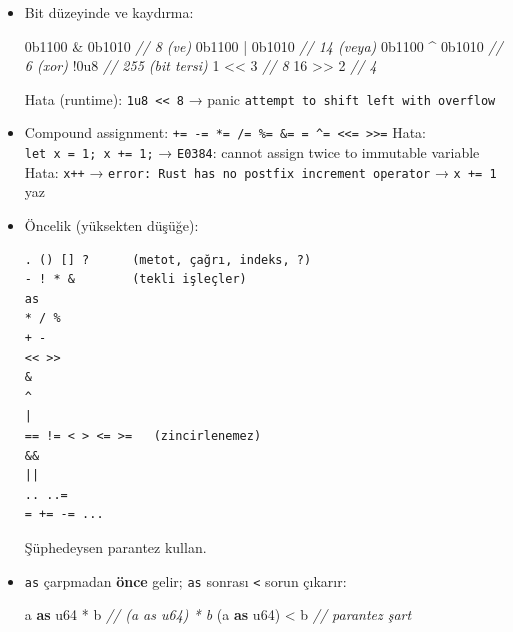 \documentclass[12pt,a4paper]{article}
\newenvironment{Shaded}{}{}
\newcommand{\BaseNTok}[1]{\textcolor[rgb]{0.25,0.63,0.44}{#1}}
\newcommand{\CommentTok}[1]{\textcolor[rgb]{0.38,0.63,0.69}{\textit{#1}}}
\newcommand{\DataTypeTok}[1]{\textcolor[rgb]{0.56,0.13,0.00}{#1}}
\newcommand{\DecValTok}[1]{\textcolor[rgb]{0.25,0.63,0.44}{#1}}
\newcommand{\KeywordTok}[1]{\textcolor[rgb]{0.00,0.44,0.13}{\textbf{#1}}}
\newcommand{\NormalTok}[1]{#1}
\newcommand{\OperatorTok}[1]{\textcolor[rgb]{0.40,0.40,0.40}{#1}}
\begin{document}
\begin{itemize}
  İlgili: \texttt{\&} ve \texttt{\textbar{}} bool üzerinde short-circuit yapmaz
\item
  Bit düzeyinde ve kaydırma:

\begin{Shaded}
\begin{Highlighting}[]
\BaseNTok{0b1100} \OperatorTok{\&} \BaseNTok{0b1010}   \CommentTok{// 8  (ve)}
\BaseNTok{0b1100} \OperatorTok{|} \BaseNTok{0b1010}   \CommentTok{// 14 (veya)}
\BaseNTok{0b1100} \OperatorTok{\^{}} \BaseNTok{0b1010}   \CommentTok{// 6  (xor)}
\OperatorTok{!}\DecValTok{0u}\DecValTok{8}              \CommentTok{// 255 (bit tersi)}
\DecValTok{1} \OperatorTok{\textless{}\textless{}} \DecValTok{3}            \CommentTok{// 8}
\DecValTok{16} \OperatorTok{\textgreater{}\textgreater{}} \DecValTok{2}           \CommentTok{// 4}
\end{Highlighting}
\end{Shaded}


  Hata (runtime): \texttt{1u8\ \textless{}\textless{}\ 8} → panic \texttt{attempt\ to\ shift\ left\ with\ overflow}
\item
  Compound assignment: \texttt{+=\ -=\ *=\ /=\ \%=\ \&=\ \textbar{}=\ \^{}=\ \textless{}\textless{}=\ \textgreater{}\textgreater{}=}
  Hata: \texttt{let\ x\ =\ 1;\ x\ +=\ 1;} → \texttt{E0384}: cannot assign twice to immutable variable
  Hata: \texttt{x++} → \texttt{error:\ Rust\ has\ no\ postfix\ increment\ operator} → \texttt{x\ +=\ 1} yaz
\item
  Öncelik (yüksekten düşüğe):

\begin{verbatim}
. () [] ?      (metot, çağrı, indeks, ?)
- ! * &        (tekli işleçler)
as
* / %
+ -
<< >>
&
^
|
== != < > <= >=   (zincirlenemez)
&&
||
.. ..=
= += -= ...
\end{verbatim}


  Şüphedeysen parantez kullan.
\item
  \texttt{as} çarpmadan \textbf{önce} gelir; \texttt{as} sonrası \texttt{\textless{}} sorun çıkarır:

\begin{Shaded}
\begin{Highlighting}[]
\NormalTok{a }\KeywordTok{as} \DataTypeTok{u64} \OperatorTok{*}\NormalTok{ b          }\CommentTok{// (a as u64) * b}
\OperatorTok{(}\NormalTok{a }\KeywordTok{as} \DataTypeTok{u64}\OperatorTok{)} \OperatorTok{\textless{}}\NormalTok{ b        }\CommentTok{// parantez şart}
\end{Highlighting}
\end{Shaded}



\end{itemize}
\end{document}
